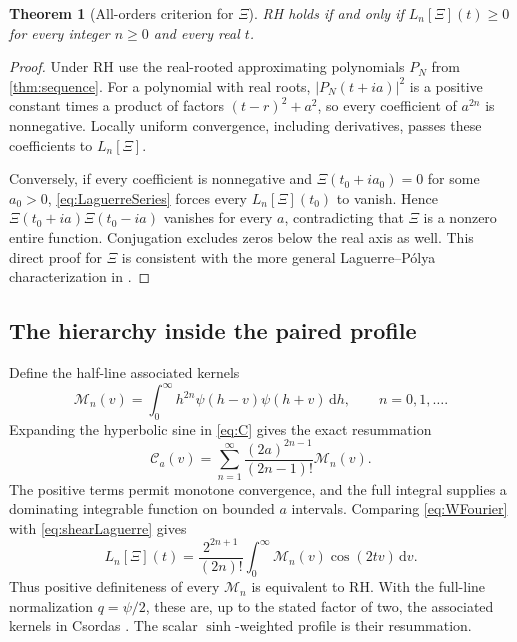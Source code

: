 \documentclass[11pt,letterpaper]{article}
\numberwithin{equation}{section}
\newtheorem{theorem}{Theorem}[section]
\theoremstyle{definition}
\theoremstyle{remark}
\newcommand{\dd}{\,\mathrm d}
\newcommand{\calC}{\mathcal C}
\newcommand{\calM}{\mathcal M}
\begin{document}
\begin{theorem}[All-orders criterion for $\Xi$]\label{thm:Laguerre}
RH holds if and only if $L_n[\Xi](t)\ge0$ for every integer $n\ge0$ and every real $t$.
\end{theorem}
\begin{proof}
Under RH use the real-rooted approximating polynomials $P_N$ from \cref{thm:sequence}. For a polynomial with real roots, $|P_N(t+ia)|^2$ is a positive constant times a product of factors $(t-r)^2+a^2$, so every coefficient of $a^{2n}$ is nonnegative. Locally uniform convergence, including derivatives, passes these coefficients to $L_n[\Xi]$.

Conversely, if every coefficient is nonnegative and $\Xi(t_0+ia_0)=0$ for some $a_0>0$, \eqref{eq:LaguerreSeries} forces every $L_n[\Xi](t_0)$ to vanish. Hence $\Xi(t_0+ia)\Xi(t_0-ia)$ vanishes for every $a$, contradicting that $\Xi$ is a nonzero entire function. Conjugation excludes zeros below the real axis as well. This direct proof for $\Xi$ is consistent with the more general Laguerre--P\'olya characterization in \cite{cv}.
\end{proof}

\subsection{The hierarchy inside the paired profile}
Define the half-line associated kernels
\begin{equation}\label{eq:Mn}
\calM_n(v)=\int_0^\infty h^{2n}\psi(h-v)\psi(h+v)\dd h,
\qquad n=0,1,\ldots.
\end{equation}
Expanding the hyperbolic sine in \eqref{eq:C} gives the exact resummation
\begin{equation}\label{eq:Cresum}
\calC_a(v)=\sum_{n=1}^\infty
\frac{(2a)^{2n-1}}{(2n-1)!}\calM_n(v).
\end{equation}
The positive terms permit monotone convergence, and the full integral supplies a dominating integrable function on bounded $a$ intervals. Comparing \eqref{eq:WFourier} with \eqref{eq:shearLaguerre} gives
\begin{equation}\label{eq:Mlaguerre}
L_n[\Xi](t)=\frac{2^{2n+1}}{(2n)!}
\int_0^\infty\calM_n(v)\cos(2tv)\dd v.
\end{equation}
Thus positive definiteness of every $\calM_n$ is equivalent to RH. With the full-line normalization $q=\psi/2$, these are, up to the stated factor of two, the associated kernels in Csordas \cite{csordas}. The scalar $\sinh$-weighted profile is their resummation.
\end{document}
